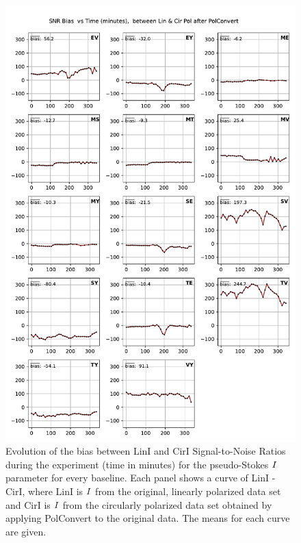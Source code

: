 \documentclass[letterpaper,twoside,12pt]{article}
\begin{document}
\begin{figure}[ht!]
  \begin{center}
  \includegraphics[width=33pc]{SNR_bias_between_Lin_I_and_Cir_I.pdf}
  \caption{\small Evolution of the bias between LinI and CirI Signal-to-Noise Ratios during the experiment (time in minutes) for the pseudo-Stokes $\protect I$ parameter for every baseline. Each panel shows a curve of LinI - CirI, where LinI is $\protect I$ from the original, linearly polarized data set and CirI is $\protect I$ from the circularly polarized data set obtained by applying PolConvert to the original data. The means for each curve are given.}
  \label{snr_lin_cir_bias}
  \end{center}
\end{figure}
\end{document}
